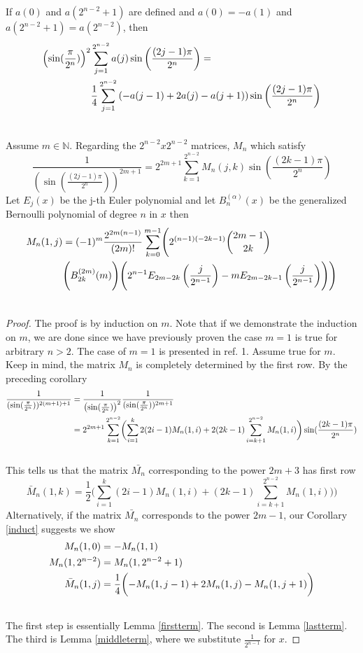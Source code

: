 \documentclass[fleqn,a4paper,9pt]{article}
\begin{document}
\begin{flushleft}
\begin{corollary}
If $a(0)$ and $a(2^{n-2}+1)$ are defined and $a(0)=-a(1)$ and $a(2^{n-2}+1)=a(2^{n-2})$, then
\begin{align}
\left(\sin(\frac{\pi}{2^n})\right)^2&\sum_{j=1}^{2^{n-2}}a(j)\sin\left(\frac{(2j-1)\pi}{2^n}\right)=\\\notag
&\frac{1}{4}\sum_{j=1}^{2^{n-2}}\left(-a(j-1)+2a(j)-a(j+1)\right)\sin\left(\frac{(2j-1)\pi}{2^n}\right)\\\notag
\end{align}
\end {corollary}

\begin{proposition}\label{Mmatrix}

Assume $m\in\mathbb{N}$. Regarding the $2^{n-2}x2^{n-2}$ matrices, $M_n$ which satisfy $$\frac{1}{(\sin(\frac{(2j-1)\pi}{2^n}))^{2m+1}}=2^{2m+1} \sum_{k=1}^{2^{n-2}}M_n(j,k)\sin(\frac{(2k-1)\pi}{2^n})$$
Let $E_j(x)$ be the j-th Euler polynomial and let $B_n^{(\alpha)}(x)$ be the generalized Bernoulli polynomial of degree $n$ in $x$ then
\begin{align}
M_n(1,j)&=(-1)^m\frac{2^{2m(n-1)}}{(2m)!}\sum_{k=0}^{m-1}\Biggl(2^{(n-1)(-2k-1)}\binom{2m-1}{2k}\\\notag
&\Biggl(B_{2k}^{(2m)}(m)\Biggr)\Biggl(2^{n-1}E_{2m-2k}\left(\frac{j}{2^{n-1}}\right)-mE_{2m-2k-1}\left(\frac{j}{2^{n-1}}\right)\Biggr)\Biggr)\\\notag
\end{align}
\end{proposition}
\begin{proof}
The proof is by induction on $m$. Note that if we demonstrate the induction on $m$, we are done since we have previously proven the case $m=1$ is true for arbitrary $n>2$. The case of $m=1$ is presented in ref. 1. Assume true for $m$. Keep in mind, the matrix $M_n$ is completely determined by the first row. By the preceding corollary
\begin{align}
\frac{1}{(\sin(\frac{\pi}{2^n}))^{2(m+1)+1}}&=\frac{1}{\left(\sin(\frac{\pi}{2^n})\right)^2}\frac{1}{(\sin(\frac{\pi}{2^n}))^{2m+1}}\\\notag
&=2^{2m+1}\sum_{k=1}^{2^{n-2}}\biggl(\sum_{i=1}^k2(2i-1)M_n(1,i)+2(2k-1)\sum_{i=k+1}^{2^{n-2}}M_n(1,i)\biggr)\sin(\frac{(2k-1)\pi}{2^n})\\\notag
\end{align}
This tells us that the matrix $\bar{M_n}$ corresponding to the power $2m+3$ has first row $$\bar{M}_n(1,k)=\frac{1}{2}\bigl(\sum_{i=1}^k(2i-1)M_n(1,i)+(2k-1)\sum_{i=k+1}^{2^{n-2}}M_n(1,i))\bigr)$$
Alternatively, if the matrix $\bar{M_n}$ corresponds to the power $2m-1$, our  Corollary \ref{induct} suggests we show
\begin{align}
M_n(1,0)&=-M_n(1,1)\\\notag
M_n(1,2^{n-2})&=M_n(1,2^{n-2}+1)\\\notag
\bar{M}_{n}(1,j)&=\frac{1}{4}\biggl(-M_n(1,j-1)+2M_n(1,j)-M_n(1,j+1)\biggr)\\\notag
\end{align}
The first step is essentially Lemma \ref{firstterm}. The second is Lemma \ref{lastterm}. The third is Lemma \ref{middleterm}, where we substitute $\frac{1}{2^{n-1}}$ for $x$.


\end{proof}
\end{flushleft}
\end{document}
